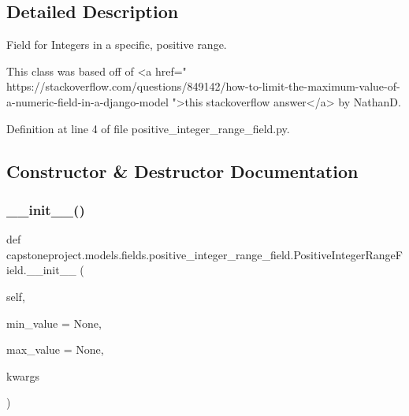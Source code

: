\subsection{Detailed Description}
\begin{DoxyVerb}Field for Integers in a specific, positive range.

This class was based off of <a href="
https://stackoverflow.com/questions/849142/how-to-limit-the-maximum-value-of-a-numeric-field-in-a-django-model
">this stackoverflow answer</a> by NathanD.
\end{DoxyVerb}
 

Definition at line 4 of file positive\+\_\+integer\+\_\+range\+\_\+field.\+py.



\subsection{Constructor \& Destructor Documentation}
\mbox{\label{classcapstoneproject_1_1models_1_1fields_1_1positive__integer__range__field_1_1_positive_integer_range_field_a6bd04fb6777c7945073fa3d47a2d5f4c}} 
\subsubsection{\texorpdfstring{\+\_\+\+\_\+init\+\_\+\+\_\+()}{\_\_init\_\_()}}
{\footnotesize\ttfamily def capstoneproject.\+models.\+fields.\+positive\+\_\+integer\+\_\+range\+\_\+field.\+Positive\+Integer\+Range\+Field.\+\_\+\+\_\+init\+\_\+\+\_\+ (\begin{DoxyParamCaption}\item[{}]{self,  }\item[{}]{min\+\_\+value = {\ttfamily None},  }\item[{}]{max\+\_\+value = {\ttfamily None},  }\item[{}]{kwargs }\end{DoxyParamCaption})}

